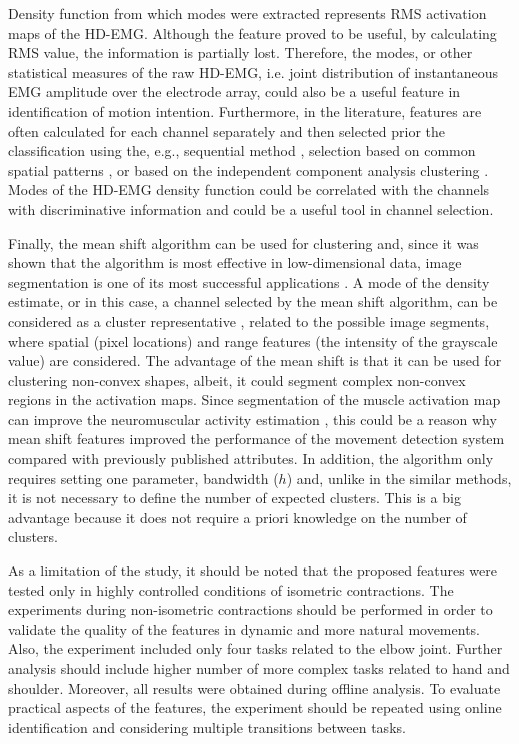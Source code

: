 Density function from which modes were extracted represents RMS activation maps of the HD-EMG. Although the feature proved to be useful, by calculating RMS value, the information is partially lost. Therefore, the modes, or other statistical measures of the raw HD-EMG, i.e. joint distribution of instantaneous EMG amplitude over the electrode array, could also be a useful feature in identification of motion intention. Furthermore, in the literature, features are often calculated for each channel separately and then selected prior the classification using the, e.g., sequential method \citep{Hargrove2009, Li2017}, selection based on common spatial patterns \citep{Geng2014}, or based on the independent component analysis clustering \citep{Naik2016}. Modes of the HD-EMG density function could be correlated with the channels with discriminative information and could be a useful tool in channel selection.

Finally, the mean shift algorithm can be used for clustering and, since it was shown that the algorithm is most effective in low-dimensional data, image segmentation is one of its most successful applications \citep{Comaniciu2002}. A mode of the density estimate, or in this case, a channel selected by the mean shift algorithm, can be considered as a cluster representative \citep{Hennig2015}, related to the possible image segments, where spatial (pixel locations) and range features (the intensity of the grayscale value) are considered. The advantage of the mean shift is that it can be used for clustering non-convex shapes, albeit, it could segment complex non-convex regions in the activation maps. Since segmentation of the muscle activation map can improve the neuromuscular activity estimation \citep{Vieira2010}, this could be a reason why mean shift features improved the performance of the movement detection system compared with previously published attributes. In addition, the algorithm only requires setting one parameter, bandwidth ($h$) and, unlike in the similar methods, it is not necessary to define the number of expected clusters. This is a big advantage because it does not require a priori knowledge on the number of clusters.

As a limitation of the study, it should be noted that the proposed features were tested only in highly controlled conditions of isometric contractions. The experiments during non-isometric contractions should be performed in order to validate the quality of the features in dynamic and more natural movements. Also, the experiment included only four tasks related to the elbow joint. Further analysis should include higher number of more complex tasks related to hand and shoulder. Moreover, all results were obtained during offline analysis. To evaluate practical aspects of the features, the experiment should be repeated using online identification and considering multiple transitions between tasks.


